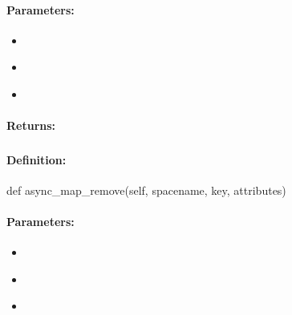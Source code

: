 \paragraph{Parameters:}
\begin{itemize}[noitemsep]
\item {}\\

\item {}\\

\item {}\\

\end{itemize}

\paragraph{Returns:}


\pagebreak
\subsubsection{}
\label{api:python:async_map_remove}


\paragraph{Definition:}
\begin{pythoncode}
def async_map_remove(self, spacename, key, attributes)
\end{pythoncode}

\paragraph{Parameters:}
\begin{itemize}[noitemsep]
\item {}\\

\item {}\\

\item {}\\

\end{itemize}

